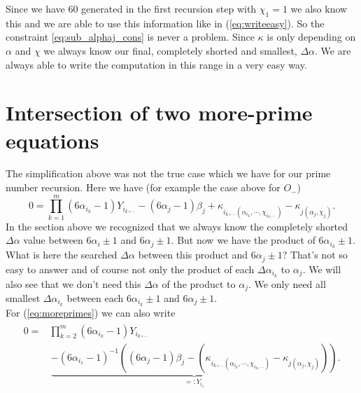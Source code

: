 \documentclass{amsart}
\begin{document}
Since we have $60$ generated in the first recursion step with $\chi_{1} = 1$ we also know this and we are able to use this information like in (\ref{eq:writeeasy}). So the constraint \ref{eq:sub_alphaj_cons} is never a problem. Since $\kappa$ is only depending on $\alpha$ and $\chi$ we always know our final, completely shorted and smallest, $\Delta \alpha$. We are always able to write the computation in this range in a very easy way.
\section{Intersection of two more-prime equations}
\label{s:moreprime}
The simplification above was not the true case which we have for our prime number recursion. Here we have (for example the case above for $O_{-}$)
\begin{equation}
	0 = \prod_{k=1}^{m}\left(6\alpha_{i_{k}} - 1\right)Y_{i_{k\circ\cdots}} - \left(6\alpha_{j} - 1\right)\beta_{j} + \kappa_{i_{k\circ\cdots}\left(\alpha_{i_{k}}, \cdots, \chi_{i_{k}, \cdots}\right)} - \kappa_{j\left(\alpha_{j},\chi_{j}\right)}.
\label{eq:moreprimes}\end{equation}
In the section above we recognized that we always know the completely shorted $\Delta\alpha$ value between $6\alpha_{i} \pm 1$ and $6\alpha_{j} \pm 1$. But now we have the product of $6\alpha_{i_{k}} \pm 1$. What is here the searched $\Delta\alpha$ between this product and $6\alpha_{j} \pm 1$? That's not so easy to answer and of course not only the product of each $\Delta\alpha_{i_{k}}$ to $\alpha_{j}$. We will also see that we don't need this $\Delta\alpha$ of the product to $\alpha_{j}$. We only need all smallest $\Delta\alpha_{i_{k}}$ between each $6\alpha_{i_{k}} \pm 1$ and $6\alpha_{j} \pm 1$.\\
For (\ref{eq:moreprimes}) we can also write
\begin{align}\begin{split}
	0 = & \prod_{k=2}^{m}\left(6\alpha_{i_{k}} - 1\right)Y_{i_{k\circ\cdots}} \\
	& \, \underbrace{- \left(6\alpha_{i_{1}} - 1\right)^{-1}\left(\left(6\alpha_{j} - 1\right)\beta_{j} - \left(\kappa_{i_{k\circ\cdots}\left(\alpha_{i_{k}}, \cdots, \chi_{i_{k}, \cdots}\right)} - \kappa_{j\left(\alpha_{j},\chi_{j}\right)}\right)\right)}_{=:Y_{i_{1}}}.
\end{split}\label{eq:moreprimes_s1}\end{align}
\end{document}
